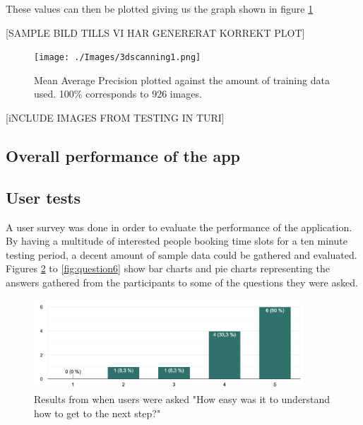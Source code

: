 These values can then be plotted giving us the graph shown in figure \ref{fig:mAPResult}

[SAMPLE BILD TILLS VI HAR GENERERAT KORREKT PLOT]
\begin{figure}[h]
\begin{center}
\texttt{[image: ./Images/3dscanning1.png]}
\caption{Mean Average Precision plotted against the amount of training data used. 100\% corresponds to 926 images.}
\label{fig:mAPResult}
\end{center}
\end{figure}

[iNCLUDE IMAGES FROM TESTING  IN TURI]


\subsection{Overall performance of the app}


\subsection{User tests}

A user survey was done in order to evaluate the performance of the application. By having a multitude of interested people booking time slots for a ten minute testing period, a decent amount of sample data could be gathered and evaluated. Figures \ref{fig:question1} to \ref{fig:question6} show bar charts and pie charts representing the answers gathered from the participants to some of the questions they were asked. 

\begin{figure}[hbtp]
\begin{center}
\includegraphics[width = 0.9\textwidth]{./Images/easyToGetToNext.png}
\caption{Results from when users were asked "How easy was it to understand how to get to the next step?"}
\label{fig:question1}
\end{center}
\end{figure}


